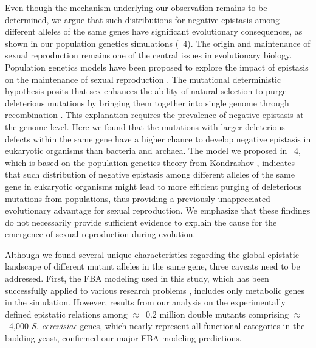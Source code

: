 Even though the mechanism underlying our observation remains to be
determined, we argue that such distributions for negative epistasis
among different alleles of the same genes have significant
evolutionary consequences, as shown in our population genetics
simulations (\Fig~4). The origin and maintenance of sexual
reproduction remains one of the central issues in evolutionary
biology. Population genetics models have been proposed to explore the
impact of epistasis on the maintenance of sexual reproduction
\citep{Kondrashov1988, Otto2007, DeVisser2007, Kouyos2007}. The
mutational deterministic hypothesis posits that sex
enhances the ability of natural selection to purge deleterious
mutations by bringing them together into single genome through
recombination \citep{Kondrashov1988}. This explanation requires the prevalence of
negative epistasis at the genome level. Here we found that the
mutations with larger deleterious defects within the same gene have a
higher chance to develop negative epistasis in eukaryotic organisms
than bacteria and archaea. The model we proposed in \Fig~4, which is
based on the population genetics theory from Kondrashov \citep{Kondrashov1988},
indicates that such distribution of negative epistasis among different
alleles of the same gene in eukaryotic organisms might lead to more
efficient purging of deleterious mutations from populations, thus
providing a previously unappreciated evolutionary advantage for sexual
reproduction. We emphasize that these findings do not necessarily
provide sufficient evidence to explain the cause for the emergence of
sexual reproduction during evolution.

Although we found several unique characteristics regarding the global
epistatic landscape of different mutant alleles in the same gene,
three caveats need to be addressed. First, the FBA modeling used in
this study, which has been successfully applied to various research
problems \citep{Papp2004, Ibarra2002, Harrison2007, Deutscher2006,
Segre2005, He2010}, includes only metabolic genes in the
simulation. However, results from our analysis on the experimentally
defined epistatic relations among $\approx$~0.2 million double mutants
comprising $\approx$~4,000 \textit{S. cerevisiae} genes, which nearly
represent all functional categories in the budding yeast, confirmed
our major FBA modeling predictions.

